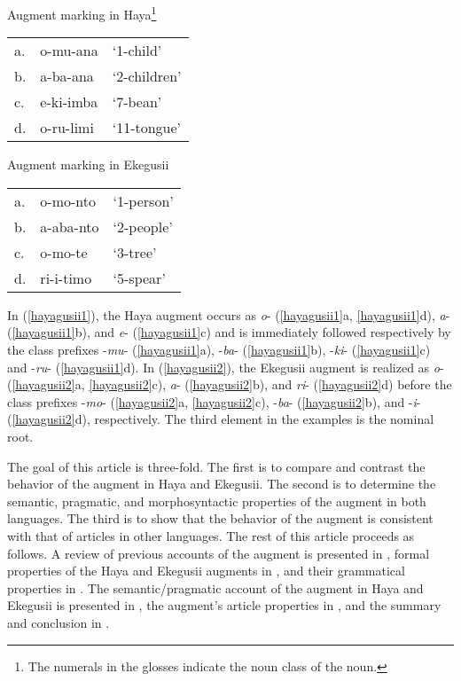 \documentclass[output=paper]{langscibook}
\begin{document}
\ea
 Augment marking in Haya\footnote{The numerals in the glosses indicate the noun class of the noun.} \\\label{hayagusii1}
\begin{tabular}{p{0.5cm} p{3cm} p{3cm}}
    a. & o-mu-ana  &	‘1-child’  \\
    b.  & 	a-ba-ana  &	‘2-children’ \\
    c. & 	e-ki-imba  &	‘7-bean’ \\
    d. & 	o-ru-limi &	‘11-tongue’ \\
\end{tabular}
\ex Augment marking in Ekegusii\label{hayagusii2}\\
\begin{tabular}{p{0.5cm} p{3cm} p{3cm}}
    a. & o-mo-nto &	‘1-person’  \\
    b.  & a-aba-nto	& ‘2-people’ \\
    c. & o-mo-te	&	‘3-tree’ \\
    d. & ri-i-timo	&	‘5-spear’ \\
\end{tabular}
\z
In (\ref{hayagusii1}), the Haya augment occurs as \textit{o}- (\ref{hayagusii1}a, \ref{hayagusii1}d), \textit{a}- (\ref{hayagusii1}b), and \textit{e}- (\ref{hayagusii1}c) and is immediately followed respectively by the class prefixes -\textit{mu}- (\ref{hayagusii1}a), -\textit{ba}- (\ref{hayagusii1}b), -\textit{ki}- (\ref{hayagusii1}c) and -\textit{ru}- (\ref{hayagusii1}d). In (\ref{hayagusii2}), the Ekegusii augment is realized as \textit{o}- (\ref{hayagusii2}a, \ref{hayagusii2}c), \textit{a}- (\ref{hayagusii2}b), and \textit{ri}- (\ref{hayagusii2}d) before the class prefixes -\textit{mo}- (\ref{hayagusii2}a, \ref{hayagusii2}c), -\textit{ba}- (\ref{hayagusii2}b), and -\textit{i}- (\ref{hayagusii2}d), respectively. The third element in the examples is the nominal root.

The goal of this article is three-fold. The first is to compare and contrast the behavior of the augment in Haya and Ekegusii. The second is to determine the semantic, pragmatic, and morphosyntactic properties of the augment in both languages. The third is to show that the behavior of the augment is consistent with that of articles in other languages. The rest of this article proceeds as follows. A review of previous accounts of the augment is presented in , formal properties of the Haya and Ekegusii augments in , and their grammatical properties in . The semantic/pragmatic account of the augment in Haya and Ekegusii is presented in , the augment’s article properties in , and the summary and conclusion in .
\end{document}

